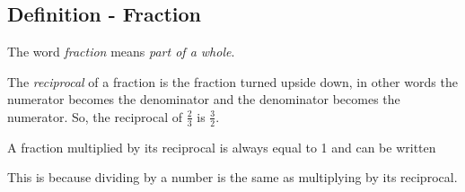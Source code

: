             \subsection{  Definition - Fraction }
            \nopagebreak
      \label{m38346*id177118}The word \textsl{fraction} means \textsl{part
of a whole}. \par 
      \label{m38346*id177140}The \textsl{reciprocal} of a fraction is the fraction turned upside down, in
other words the numerator becomes the denominator and the denominator becomes
the numerator. So, the reciprocal of $\frac{2}{3}$ is $\frac{3}{2}$.\par 
      \label{m38346*id177178}A fraction multiplied by its reciprocal is always equal to 1 and can be
written\par 
      \label{m38346*uid48}\nopagebreak\noindent{}
      \label{m38346*id177217}This is because dividing by a number is the same as multiplying by its
reciprocal.\par 
\label{m38346*secfhsst!!!underscore!!!id1780}

